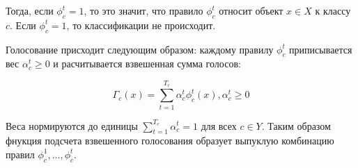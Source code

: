 Тогда, если $\phi^{t}_{c} = 1 $, то это значит, что правило $\phi^{t}_{c}$ относит объект $x \in X$ к классу $c$. Если $\phi^{t}_{c} = 1 $, то классификации не происходит.

Голосование присходит следующим образом: каждому правилу $\phi^{t}_{c}$ приписывается вес $\alpha_{c}^{t} \geq 0$ и расчитывается взвешенная сумма голосов:

\begin{equation}
    \label{eq:equation50}
    \Gamma_c(x) = \displaystyle\sum_{t=1}^{T_c} \alpha_c^t\phi_c^t(x), \alpha_c^t \geq 0
\end{equation}

Веса нормируются до единицы $\displaystyle\sum_{t=1}^{T_c}\alpha_c^t = 1$ для всех $c \in Y$. Таким образом фнукция подсчета взвешенного голосования образует выпуклую комбинацию правил  $\phi_c^1 ,  ... , \phi_c^t$.

